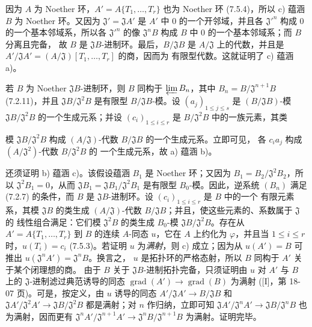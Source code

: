 \documentclass[UTF8,fontset=none,11pt,oneside,openany]{ctexbook}
\newcommand{\oldpage}[2][]{%
  \hypertarget{ega-source-page-#1-#2}{}%
  \marginnote{\scriptsize\textbf{#1}~|~#2}\ignorespaces}
\begin{document}
因为 $A$ 为 Noether 环，$A'=A\{T_1,\ldots,T_r\}$ 也为 Noether 环
(7.5.4)，所以 c) 蕴涵 $B$ 为 Noether 环。又因为
$\mathfrak J'=\mathfrak JA'$ 是 $A'$ 中 0 的一个开邻域，并且各
$\mathfrak J'^{n}$ 构成 0 的一个基本邻域系，所以各
$\mathfrak J'^{n}$ 的像 $\mathfrak J^nB$ 构成 $B$ 中 0 的一个基本邻域系；而 $B$ 分离且完备，
故 $B$ 是 $\mathfrak JB$-进制环。最后，$B/\mathfrak JB$ 是
$A/\mathfrak J$ 上的代数，并且是
$A'/\mathfrak JA'=(A/\mathfrak J)[T_1,\ldots,T_r]$ 的商，因而为
有限型代数。这就证明了 c) 蕴涵 a)。

若 $B$ 为 Noether $\mathfrak JB$-进制环，则 $B$ 同构于
$\varprojlim B_n$，其中 $B_n=B/\mathfrak J^{n+1}B$ (7.2.11)，并且
$\mathfrak JB/\mathfrak J^2B$ 是有限型 $B/\mathfrak JB$-模。设
$(a_j)_{1\leq j\leq s}$ 是 $(B/\mathfrak JB)$-模
$\mathfrak JB/\mathfrak J^2B$ 的一个生成元系；并设
$(c_i)_{1\leq i\leq r}$ 是 $B/\mathfrak J^2B$ 中的一族元素，其类

\oldpage[0\textsubscript{I}]{72}

模 $\mathfrak JB/\mathfrak J^2B$ 构成 $(A/\mathfrak J)$-代数
$B/\mathfrak JB$ 的一个生成元系。立即可见，
各 $c_ia_j$ 构成 $(A/\mathfrak J^2)$-代数 $B/\mathfrak J^2B$ 的
一个生成元系，故 a) 蕴涵 b)。

还须证明 b) 蕴涵 c)。该假设蕴涵 $B_1$ 是 Noether 环；又因为
$B_1=B_2/\mathfrak J^2B_2$，所以 $\mathfrak J^2B_1=0$，从而
$\mathfrak JB_1=\mathfrak JB_1/\mathfrak J^2B_1$ 是有限型
$B_0$-模。因此，逆系统 $(B_n)$ 满足 (7.2.7) 的条件，而 $B$ 是
$\mathfrak JB$-进制环。设 $(c_i)_{1\leq i\leq r}$ 是 $B$ 中的一个
有限元素系，其模 $\mathfrak JB$ 的类生成 $(A/\mathfrak J)$-代数
$B/\mathfrak JB$；并且，使这些元素的、系数属于 $\mathfrak J$ 的
线性组合满足：它们模 $\mathfrak J^2B$ 的类生成 $B_0$-模
$\mathfrak JB/\mathfrak J^2B$。存在从
$A'=A\{T_1,\ldots,T_r\}$ 到 $B$ 的连续 $A$-同态 $u$，它在 $A$
上约化为 $\varphi$，并且当 $1\leq i\leq r$ 时，$u(T_i)=c_i$
(7.5.3)。若证明 $u$ 为\emph{满射}，则 c) 成立；因为从
$u(A')=B$ 可推出 $u(\mathfrak J^nA')=\mathfrak J^nB$。换言之，
$u$ 是拓扑环的严格态射，所以 $B$ 同构于 $A'$ 关于某个闭理想的商。
由于 $B$ 关于 $\mathfrak JB$-进制拓扑完备，只须证明由 $u$ 对
$A'$ 与 $B$ 上的 $\mathfrak J$-进制滤过典范诱导的同态
$\operatorname{grad}(A')\to\operatorname{grad}(B)$ 为满射
([I]，第 18-07 页)。可是，按定义，由 $u$ 诱导的同态
$A'/\mathfrak JA'\to B/\mathfrak JB$ 和
$\mathfrak JA'/\mathfrak J^2A'\to\mathfrak JB/\mathfrak J^2B$
都是满射；对 $n$ 作归纳，立即可知
$\mathfrak JA'/\mathfrak J^nA'\to\mathfrak JB/\mathfrak J^nB$
也为满射，因而更有
$\mathfrak J^nA'/\mathfrak J^{n+1}A'\to
\mathfrak J^nB/\mathfrak J^{n+1}B$ 为满射。证明完毕。
\end{document}
